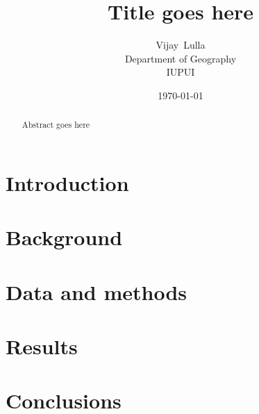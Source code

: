 \documentclass[letterpaper,11pt]{article}
\title{Title goes here}
\author{Vijay~Lulla\\
  Department of Geography\\
  IUPUI}
\date{\today}
\begin{document}
\maketitle

\begin{abstract}
Abstract goes here
\end{abstract}

\section{Introduction}
\label{sec:introduction}

\section{Background}
\label{sec:background}

\section{Data and methods}
\label{sec:data-and-methods}

\section{Results}
\label{sec:results}

\section{Conclusions}
\label{sec:conclusions}

\end{document}
